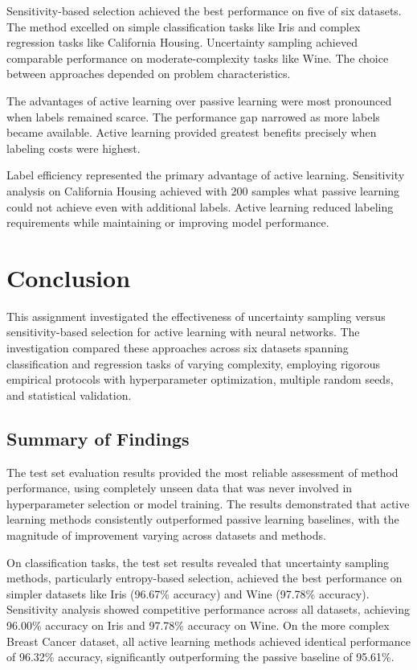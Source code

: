 \documentclass[conference]{IEEEtran}
\begin{document}
Sensitivity-based selection achieved the best performance on five of six datasets. The method excelled on simple classification tasks like Iris and complex regression tasks like California Housing. Uncertainty sampling achieved comparable performance on moderate-complexity tasks like Wine. The choice between approaches depended on problem characteristics.

The advantages of active learning over passive learning were most pronounced when labels remained scarce. The performance gap narrowed as more labels became available. Active learning provided greatest benefits precisely when labeling costs were highest.

Label efficiency represented the primary advantage of active learning. Sensitivity analysis on California Housing achieved with 200 samples what passive learning could not achieve even with additional labels. Active learning reduced labeling requirements while maintaining or improving model performance.

\section{Conclusion}

This assignment investigated the effectiveness of uncertainty sampling versus sensitivity-based selection for active learning with neural networks. The investigation compared these approaches across six datasets spanning classification and regression tasks of varying complexity, employing rigorous empirical protocols with hyperparameter optimization, multiple random seeds, and statistical validation.

\subsection{Summary of Findings}

The test set evaluation results provided the most reliable assessment of method performance, using completely unseen data that was never involved in hyperparameter selection or model training. The results demonstrated that active learning methods consistently outperformed passive learning baselines, with the magnitude of improvement varying across datasets and methods.

On classification tasks, the test set results revealed that uncertainty sampling methods, particularly entropy-based selection, achieved the best performance on simpler datasets like Iris (96.67\% accuracy) and Wine (97.78\% accuracy). Sensitivity analysis showed competitive performance across all datasets, achieving 96.00\% accuracy on Iris and 97.78\% accuracy on Wine. On the more complex Breast Cancer dataset, all active learning methods achieved identical performance of 96.32\% accuracy, significantly outperforming the passive baseline of 95.61\%.
\end{document}
